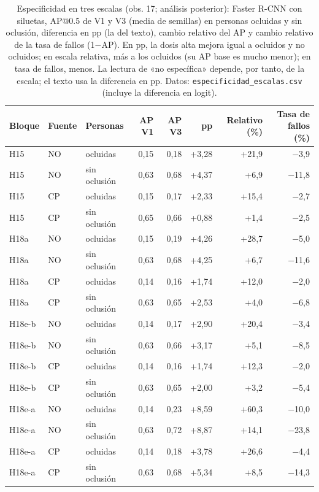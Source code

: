 \begin{table}[H]\centering\footnotesize
\caption{Especificidad en tres escalas (obs. 17; análisis posterior): Faster R-CNN con siluetas, AP@0.5 de V1 y V3 (media de semillas) en personas ocluidas y sin oclusión, diferencia en pp (la del texto), cambio relativo del AP y cambio relativo de la tasa de fallos (1$-$AP). En pp, la dosis alta mejora igual a ocluidos y no ocluidos; en escala relativa, más a los ocluidos (su AP base es mucho menor); en tasa de fallos, menos. La lectura de «no específica» depende, por tanto, de la escala; el texto usa la diferencia en pp. Datos: \texttt{especificidad\_escalas.csv} (incluye la diferencia en logit).}\label{tab:s-escalas}
\begin{tabular}{@{}lllrrrrr@{}}\toprule
Bloque & Fuente & Personas & AP V1 & AP V3 & pp & Relativo (\%) & Tasa de fallos (\%) \\\midrule
H15 & NO & ocluidas & 0,15 & 0,18 & +3{,}28 & +21{,}9 & $-$3{,}9 \\
H15 & NO & sin oclusión & 0,63 & 0,68 & +4{,}37 & +6{,}9 & $-$11{,}8 \\
H15 & CP & ocluidas & 0,15 & 0,17 & +2{,}33 & +15{,}4 & $-$2{,}7 \\
H15 & CP & sin oclusión & 0,65 & 0,66 & +0{,}88 & +1{,}4 & $-$2{,}5 \\
H18a & NO & ocluidas & 0,15 & 0,19 & +4{,}26 & +28{,}7 & $-$5{,}0 \\
H18a & NO & sin oclusión & 0,63 & 0,68 & +4{,}25 & +6{,}7 & $-$11{,}6 \\
H18a & CP & ocluidas & 0,14 & 0,16 & +1{,}74 & +12{,}0 & $-$2{,}0 \\
H18a & CP & sin oclusión & 0,63 & 0,65 & +2{,}53 & +4{,}0 & $-$6{,}8 \\
H18e-b & NO & ocluidas & 0,14 & 0,17 & +2{,}90 & +20{,}4 & $-$3{,}4 \\
H18e-b & NO & sin oclusión & 0,63 & 0,66 & +3{,}17 & +5{,}1 & $-$8{,}5 \\
H18e-b & CP & ocluidas & 0,14 & 0,16 & +1{,}74 & +12{,}3 & $-$2{,}0 \\
H18e-b & CP & sin oclusión & 0,63 & 0,65 & +2{,}00 & +3{,}2 & $-$5{,}4 \\
H18e-a & NO & ocluidas & 0,14 & 0,23 & +8{,}59 & +60{,}3 & $-$10{,}0 \\
H18e-a & NO & sin oclusión & 0,63 & 0,72 & +8{,}87 & +14{,}1 & $-$23{,}8 \\
H18e-a & CP & ocluidas & 0,14 & 0,18 & +3{,}78 & +26{,}6 & $-$4{,}4 \\
H18e-a & CP & sin oclusión & 0,63 & 0,68 & +5{,}34 & +8{,}5 & $-$14{,}3 \\
\bottomrule\end{tabular}\end{table}
